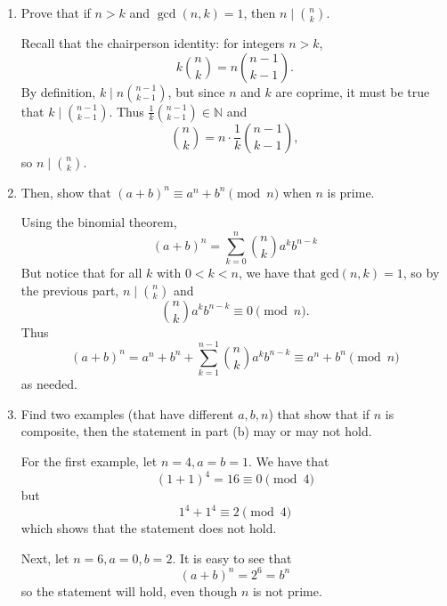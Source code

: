\documentclass{eh-homework}
\begin{document}
    \begin{question}{1}
        \begin{enumerate}[label=(\alph*)]
            \item Prove that if $n > k$ and $\gcd(n,k) = 1$, then $n \mid \binom{n}{k}$.
            
            Recall that the chairperson identity: for integers \(n > k\),
            \[
                k \binom{n}{k} = n \binom{n-1}{k-1}.
            \]
            By definition, \(k \mid n \binom{n-1}{k-1}\), but since \(n\) and \(k\) are coprime, it must be true that \(k \mid \binom{n-1}{k-1}\). Thus \(\frac{1}{k}\binom{n-1}{k-1} \in \mathbb{N}\) and
            \[
                \binom{n}{k} = n \cdot \frac{1}{k}\binom{n-1}{k-1},
            \]
            so \(n \mid \binom{n}{k}\).

            \item Then, show that $(a+b)^n \equiv a^n + b^n \pmod{n}$ when $n$ is prime. 
            
            Using the binomial theorem,
            \[
                (a+b)^n = \sum_{k=0}^{n} \binom{n}{k} a^k b^{n-k}
            \]
            But notice that for all \(k\) with \(0 < k < n\), we have that \(\mathrm{gcd} (n,k) = 1\), so by the previous part, \(n \mid \binom{n}{k}\) and
            \[
                \binom{n}{k}a^k b^{n-k} \equiv 0 \pmod n.
            \]
            Thus
            \[
                (a+b)^n = a^n + b^n + \sum_{k=1}^{n-1} \binom{n}{k}a^k b^{n-k} \equiv a^n + b^n \pmod n
            \]
            as needed.

            \item Find two examples (that have different $a, b, n$) that show that if $n$ is composite, then the statement in part (b) may or may not hold.
            
            For the first example, let \(n = 4, a = b = 1\). We have that
            \[
                (1 + 1)^4 = 16 \equiv 0 \pmod 4
            \]
            but
            \[
                1^4 + 1^4 \equiv 2 \pmod 4
            \]
            which shows that the statement does not hold.

            Next, let \(n = 6, a = 0, b = 2\). It is easy to see that
            \[
                (a+b)^n = 2^6 = b^n
            \]
            so the statement will hold, even though \(n\) is not prime.
        \end{enumerate}
    \end{question}
\end{document}
